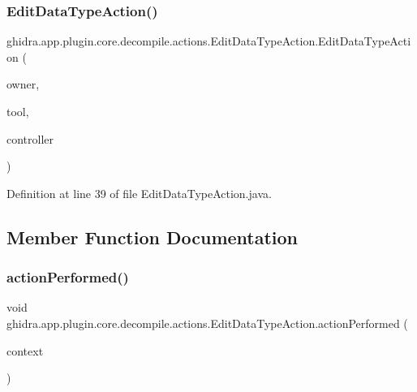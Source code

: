\subsubsection{\texorpdfstring{EditDataTypeAction()}{EditDataTypeAction()}}
{\footnotesize\ttfamily ghidra.\+app.\+plugin.\+core.\+decompile.\+actions.\+Edit\+Data\+Type\+Action.\+Edit\+Data\+Type\+Action (\begin{DoxyParamCaption}\item[{String}]{owner,  }\item[{Plugin\+Tool}]{tool,  }\item[{\mbox{\hyperlink{classghidra_1_1app_1_1decompiler_1_1component_1_1_decompiler_controller}{Decompiler\+Controller}}}]{controller }\end{DoxyParamCaption})\hspace{0.3cm}{\ttfamily [inline]}}



Definition at line 39 of file Edit\+Data\+Type\+Action.\+java.



\subsection{Member Function Documentation}
\mbox{\label{classghidra_1_1app_1_1plugin_1_1core_1_1decompile_1_1actions_1_1_edit_data_type_action_a6aab83764bae24945ea130a5bedc2da8}} 
\subsubsection{\texorpdfstring{actionPerformed()}{actionPerformed()}}
{\footnotesize\ttfamily void ghidra.\+app.\+plugin.\+core.\+decompile.\+actions.\+Edit\+Data\+Type\+Action.\+action\+Performed (\begin{DoxyParamCaption}\item[{Action\+Context}]{context }\end{DoxyParamCaption})\hspace{0.3cm}{\ttfamily [inline]}}



